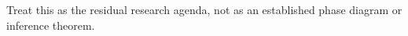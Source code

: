 Treat this as the residual research agenda, not as an established phase diagram or inference theorem.